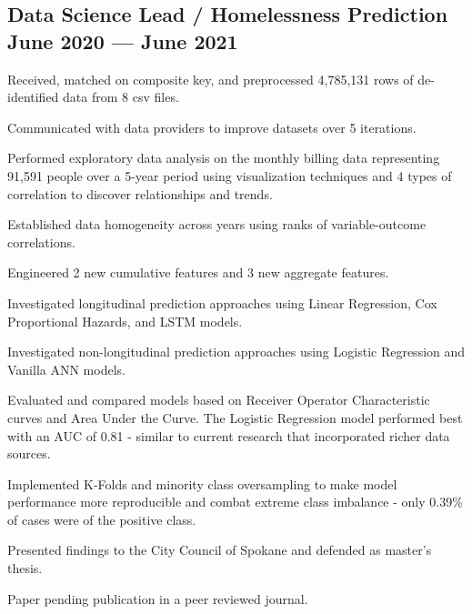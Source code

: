 \documentclass[letter,10pt]{article}
\begin{document}
\subsection{{Data Science Lead / Homelessness Prediction \hfill June 2020 --- June 2021}}
\begin{zitemize}
    \item Received, matched on composite key, and preprocessed 4,785,131 rows of de-identified data from 8 csv files.
    \item Communicated with data providers to improve datasets over 5 iterations.
    \item Performed exploratory data analysis on the monthly billing data representing 91,591 people over a 5-year period using visualization techniques and 4 types of correlation to discover relationships and trends.
    \item Established data homogeneity across years using ranks of variable-outcome correlations.
    \item Engineered 2 new cumulative features and 3 new aggregate features.
    \item Investigated longitudinal prediction approaches using Linear Regression, Cox Proportional Hazards, and LSTM models.
    \item Investigated non-longitudinal prediction approaches using Logistic Regression and Vanilla ANN models.
    \item Evaluated and compared models based on Receiver Operator Characteristic curves and Area Under the Curve. The Logistic Regression model performed best with an AUC of 0.81 - similar to current research that incorporated richer data sources.
    \item Implemented K-Folds and minority class oversampling to make model performance more reproducible and combat extreme class imbalance - only 0.39\% of cases were of the positive class.
    \item Presented findings to the City Council of Spokane and defended as master's thesis.
    \item Paper pending publication in a peer reviewed journal.
\end{zitemize}
\end{document}
